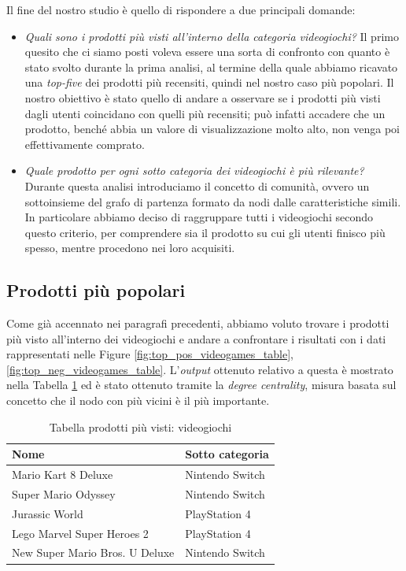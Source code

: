 		Il fine del nostro studio è quello di rispondere a due principali domande: 
		\begin{itemize}
			\item \textit{Quali sono i prodotti più visti all'interno della categoria videogiochi?}
			Il primo quesito che ci siamo posti voleva essere una sorta di confronto con quanto è stato svolto durante la prima analisi, al termine della quale abbiamo ricavato una \textit{top-five} dei prodotti più recensiti, quindi nel nostro caso più popolari. Il nostro obiettivo è stato quello di andare a osservare se i prodotti più visti dagli utenti coincidano con quelli più recensiti; può infatti accadere che un prodotto, benché abbia un valore di visualizzazione molto alto, non venga poi effettivamente comprato.
			
			\item \textit{Quale prodotto per ogni sotto categoria dei videogiochi è più rilevante?}
			Durante questa analisi introduciamo il concetto di comunità, ovvero un sottoinsieme del grafo di partenza formato da nodi dalle caratteristiche simili. In particolare abbiamo deciso di raggruppare tutti i videogiochi secondo questo criterio, per comprendere sia il prodotto su cui gli utenti finisco più spesso, mentre procedono nei loro acquisiti.
		\end{itemize}
	
	
		\subsection{Prodotti più popolari}
			Come già accennato nei paragrafi precedenti, abbiamo voluto trovare i prodotti più visto all'interno dei videogiochi e andare a confrontare i risultati con i dati rappresentati nelle Figure \ref{fig:top_pos_videogames_table}, \ref{fig:top_neg_videogames_table}. L'\textit{output} ottenuto relativo a questa è mostrato nella Tabella \ref{tab:top-five-videogames-network} ed è stato ottenuto tramite la \textit{degree centrality}, misura basata sul concetto che il nodo con più vicini è il più importante.
			
			\begin{table} [H]
				\caption{Tabella prodotti più visti: videogiochi}
				\label{tab:top-five-videogames-network}
				\centering
				\begin{tabular}{ll}
					\toprule 
					\textbf{Nome} & \textbf{Sotto categoria} \\
					\midrule
					Mario Kart 8 Deluxe & Nintendo Switch \\
					Super Mario Odyssey & Nintendo Switch \\
					Jurassic World & PlayStation 4 \\
					Lego Marvel Super Heroes 2 & PlayStation 4 \\
					New Super Mario Bros. U Deluxe & Nintendo Switch \\
					\bottomrule
				\end{tabular}
			\end{table}
			
